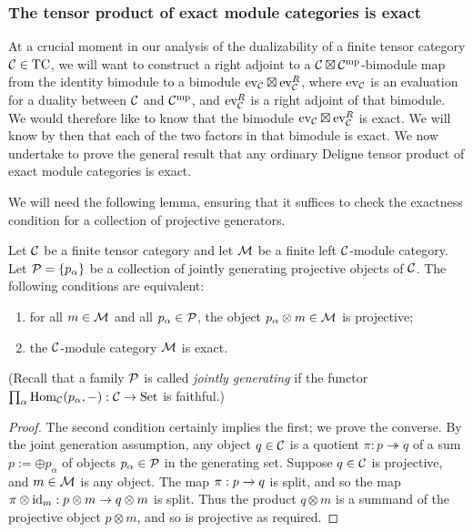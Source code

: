 \documentclass{amsart}
\begin{document}
\subsubsection{The tensor product of exact module categories is exact} \label{sec:tensorexact}

At a crucial moment in our analysis of the dualizability of a finite tensor category $\mathcal C \in \mathrm{TC}$, we will want to construct a right adjoint to a $\mathcal C \boxtimes \mathcal C^{\mathrm{mp}}$-bimodule map from the identity bimodule to a bimodule $\mathrm{ev}_\mathcal C \boxtimes \mathrm{ev}_\mathcal C^R$, where $\mathrm{ev}_\mathcal C$ is an evaluation for a duality between $\mathcal C$ and $\mathcal C^{\mathrm{mp}}$, and $\mathrm{ev}_\mathcal C^R$ is a right adjoint of that bimodule.  We would therefore like to know that the bimodule $\mathrm{ev}_\mathcal C \boxtimes \mathrm{ev}_\mathcal C^R$ is exact.  We will know by then that each of the two factors in that bimodule is exact.  We now undertake to prove the general result that any ordinary Deligne tensor product of exact module categories is exact.

We will need the following lemma, ensuring that it suffices to check the exactness condition for a collection of projective generators.

\begin{lemma} \label{lma:Exact_checked_on_proj_gens}
	Let $\mathcal C$ be a finite tensor category and let $\mathcal M$ be a finite left $\mathcal C$-module category. Let $\mathcal P = \{ p_\alpha \}$ be a collection of jointly generating projective objects of  $\mathcal C$. The following conditions are equivalent:
	\begin{enumerate}
		\item for all $m \in \mathcal M$ and all $p_\alpha \in \mathcal P$, the object $p_\alpha \otimes m \in \mathcal M$ is projective;
		\item the $\mathcal C$-module category $\mathcal M$ is exact.
	\end{enumerate}
\end{lemma}

\noindent (Recall that a family $\mathcal P$ is called {\em jointly generating} if the functor $\prod_\alpha \operatorname{Hom}_\mathcal C(p_\alpha, -): \mathcal C \to \mathrm{Set}$ is faithful.)

\begin{proof}
The second condition certainly implies the first; we prove the converse.  By the joint generation assumption, any object $q \in \mathcal C$ is a quotient $\pi: p \twoheadrightarrow q$ of a sum $p := \oplus p_\alpha$ of objects $p_\alpha \in \mathcal P$ in the generating set.  Suppose $q \in \mathcal C$ is projective, and $m \in \mathcal M$ is any object.  The map $\pi: p \rightarrow q$ is split, and so the map $\pi \otimes \mathrm{id}_m: p \otimes m \rightarrow q \otimes m$ is split.  Thus the product $q \otimes m$ is a summand of the projective object $p \otimes m$, and so is projective as required.
\end{proof}
\end{document}
